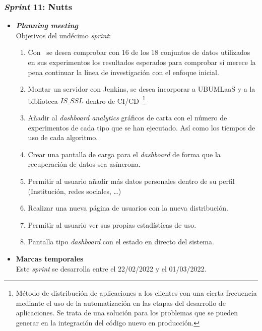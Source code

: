 \subsubsection{\textit{Sprint} 11: Nutts}
\begin{itemize}
\item \textbf{\textit{Planning meeting}}\\
Objetivos del undécimo \textit{sprint}:
\begin{enumerate}
\item Con~\cite{LI2019104895} se desea comprobar con 16 de los 18 conjuntos de datos utilizados en sus experimentos los resultados esperados para comprobar si merece la pena continuar la línea de investigación con el enfoque inicial.

\item Montar un servidor con Jenkins, se desea incorporar a UBUMLaaS y a la biblioteca $IS\_SSL$ dentro de CI/CD~\footnote{Método de distribución de aplicaciones a los clientes con una cierta frecuencia mediante el uso de la automatización en las etapas del desarrollo de aplicaciones. Se trata de una solución para los problemas que se pueden generar en la integración del código nuevo en producción.}
\item Añadir al \textit{dashboard analytics} gráficos de carta con el número de experimentos de cada tipo que se han ejecutado. Así como los tiempos de uso de cada algoritmo.
\item Crear una pantalla de carga para el \textit{dashboard} de forma que la recuperación de datos sea asíncrona.
\item Permitir al usuario añadir más datos personales dentro de su perfil (Institución,  redes sociales, \dots)
\item Realizar una nueva página de usuarios con la nueva distribución.
\item Permitir al usuario ver sus propias estadísticas de uso. 
\item Pantalla tipo \textit{dashboard} con el estado en directo del sistema.
\end{enumerate}

\item \textbf{Marcas temporales}\\
Este \textit{sprint} se desarrolla entre el 22/02/2022 y el 01/03/2022.


\end{itemize}
